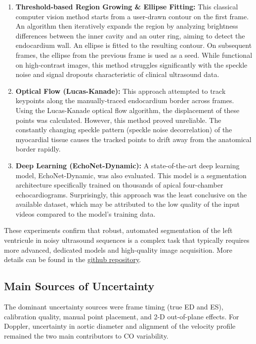 \begin{enumerate}
    \item \textbf{Threshold-based Region Growing \& Ellipse Fitting:} This classical computer vision method starts from a user-drawn contour on the first frame. An algorithm then iteratively expands the region by analyzing brightness differences between the inner cavity and an outer ring, aiming to detect the endocardium wall. An ellipse is fitted to the resulting contour. On subsequent frames, the ellipse from the previous frame is used as a seed. While functional on high-contrast images, this method struggles significantly with the speckle noise and signal dropouts characteristic of clinical ultrasound data.

    \item \textbf{Optical Flow (Lucas-Kanade):} This approach attempted to track keypoints along the manually-traced endocardium border across frames. Using the Lucas-Kanade optical flow algorithm, the displacement of these points was calculated. However, this method proved unreliable. The constantly changing speckle pattern (speckle noise decorrelation) of the myocardial tissue causes the tracked points to drift away from the anatomical border rapidly.

    \item \textbf{Deep Learning (EchoNet-Dynamic):} A state-of-the-art deep learning model, EchoNet-Dynamic, was also evaluated. This model is a segmentation architecture specifically trained on thousands of apical four-chamber echocardiograms. Surprisingly, this approach was the least conclusive on the available dataset, which may be attributed to the low quality of the input videos compared to the model's training data.
\end{enumerate}

These experiments confirm that robust, automated segmentation of the left ventricule in noisy ultrasound sequences is a complex task that typically requires more advanced, dedicated models and high-quality image acquisition. More details can be found in the \href{https://github.com/ThomasMoulin-hub/Echocardiography-Auto-Volume-Analyzer}{\uline{github repository}}.

\subsection{Main Sources of Uncertainty}
The dominant uncertainty sources were frame timing (true ED and ES), calibration quality, manual point placement, and 2-D out-of-plane effects. For Doppler, uncertainty in aortic diameter and alignment of the velocity profile remained the two main contributors to CO variability.

